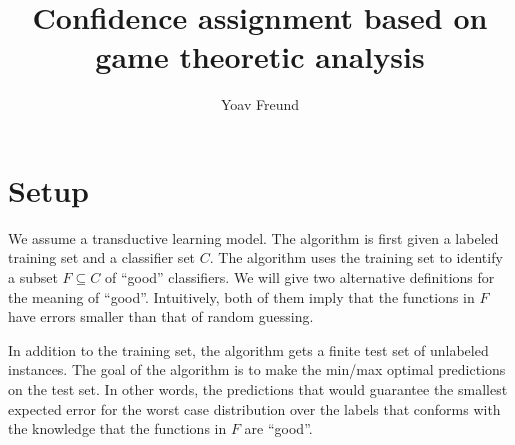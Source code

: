 \documentclass{article}[12pt]
\title{Confidence assignment based on game theoretic analysis}
\author{Yoav Freund}
\begin{document}
\maketitle

\newcommand{\corr}{\mbox{corr}}
\newcommand{\Exy}[1]{E_{(x_i,y_i)}\left( #1 \right)} 
\newcommand{\ones}[1]{\mathbbm{1}^{#1}}
\newcommand{\vA}{\mathbf{A}}    %
\newcommand{\vd}{\mathbf{d}}    %
\newcommand{\vF}{\mathbf{F}}    %
\newcommand{\vI}{\mathbf{I}}    %
\newcommand{\vb}{\mathbf{b}}    %
\newcommand{\vu}{\mathbf{u}}    %
\newcommand{\vl}{\mathbf{l}}    %
\newcommand{\vg}{\mathbf{g}}    %
\newcommand{\vp}{\mathbf{p}}
\newcommand{\vq}{\mathbf{q}}
\newcommand{\vr}{\mathbf{r}}
\newcommand{\vs}{\mathbf{s}}
\newcommand{\vv}{\mathbf{v}}
\newcommand{\vz}{\mathbf{z}}
\newcommand{\vzero}{\mathbf{0}}
\newcommand{\vone}{\mathbf{1}}

\section{Setup}
We assume a transductive learning model. The algorithm is first given
a labeled training set and a classifier set $C$. The algorithm uses
the training set to identify a subset $F \subseteq C$ of ``good''
classifiers. We will give two alternative definitions for the meaning
of ``good''. Intuitively, both of them imply that the functions in $F$
have errors smaller than that of random guessing.

In addition to the training set, the algorithm gets a finite test set
of unlabeled instances. The goal of the algorithm is to make the
min/max optimal predictions on the test set. In other words, the
predictions that would guarantee the smallest expected error for the
worst case distribution over the labels that conforms with the
knowledge that the functions in $F$ are ``good''.
\end{document}
